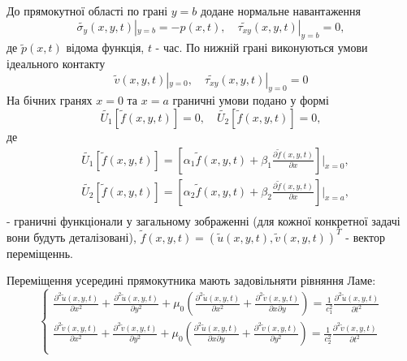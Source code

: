 До прямокутної області по грані $y=b$ додане нормальне навантаження
\begin{equation}
    \widetilde{\sigma_y}(x, y, t) |_{y=b} = -p(x, t), \quad  \widetilde{\tau_{xy}}(x,y,t) |_{y=b} =0,
\end{equation}
де $\widetilde{p}(x, t)$ відома функція, $t$ - час.
По нижній грані виконуються умови ідеального контакту
\begin{equation}
    \widetilde{v}(x,y,t) |_{y=0}, \quad \widetilde{\tau_{xy}}(x,y,t) |_{y=0} =0
\end{equation}
На бічних гранях $x=0$ та $x=a$ граничні умови подано у формі
\begin{equation}\label{gen_bound_gen}
    \widetilde{U_1}[\widetilde{f}(x,y,t)]=0, \quad \widetilde{U_2}[\widetilde{f}(x,y,t)]=0 ,
\end{equation}
де 
\begin{align*}
    &\widetilde{U_1}[\widetilde{f}(x,y,t)]=\left[\alpha_1\widetilde{f}(x,y,t) + \beta_1 \frac{\partial \widetilde{f}(x,y,t)}{\partial x} \right]|_{x=0}, \\
    &\widetilde{U_2}[\widetilde{f}(x,y,t)]=\left[\alpha_2\widetilde{f}(x,y,t) + \beta_2 \frac{\partial \widetilde{f}(x,y,t)}{\partial x} \right]|_{x=a}, \\
\end{align*}
- граничні функціонали у загальному зображенні (для кожної конкретної задачі вони будуть деталізовані), $\widetilde{f}(x,y,t)=(\widetilde{u}(x,y,t), \widetilde{v}(x,y,t))^T$ - вектор переміщеннь.

Переміщення усередині прямокутника мають задовільняти рівняння Ламе:
\begin{equation}
    \begin{cases}
        \frac{\partial^2 \widetilde{u}(x,y,t)}{\partial x^2} + \frac{\partial^2 \widetilde{u}(x,y,t)}{\partial y^2} + \mu_0 (\frac{\partial^2 \widetilde{u}(x,y,t)}{\partial x^2} + \frac{\partial^2 \widetilde{v}(x,y,t)}{\partial x\partial y}) = \frac{1}{c_1^2} \frac{\partial^2 \widetilde{u}(x,y,t)}{\partial t^2} \\
        \frac{\partial^2 \widetilde{v}(x,y,t)}{\partial x^2} + \frac{\partial^2 \widetilde{v}(x,y,t)}{\partial y^2} + \mu_0 (\frac{\partial^2 \widetilde{u}(x,y,t)}{\partial x \partial y} + \frac{\partial^2 \widetilde{v}(x,y,t)}{\partial y^2}) = \frac{1}{c_2^2} \frac{\partial^2 \widetilde{v}(x,y,t)}{\partial t^2} \\
    \end{cases}
\end{equation}


